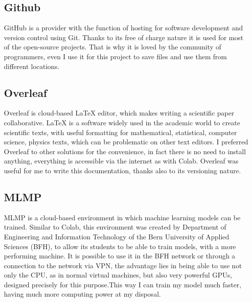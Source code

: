 \subsection{Github}
\gls{GitHub} \cite{github_inc_github_nodate} is a provider with the function of hosting for software development and version control using Git.
Thanks to its free of charge nature it is used for most of the open-source projects.
That is why it is loved by the community of programmers, even I use it for this project to save files and use them from different locations.


\subsection{Overleaf}
\gls{Overleaf} \cite{noauthor_overleaf_nodate} is cloud-based \LaTeX{} editor, which makes writing a scientific paper collaborative. \LaTeX{} is a software widely used in the academic world to create scientific texts, with useful formatting for mathematical, statistical, computer science, physics texts, which can be problematic on other text editors.
I preferred \gls{Overleaf} to other solutions for the convenience, in fact there is no need to install anything, everything is accessible via the internet as with Colab.
\gls{Overleaf} was useful for me to write this documentation, thanks also to its versioning nature.

\subsection{MLMP}
\gls{MLMP} \cite{berner_fachhochschule_mlmp_nodate} is a cloud-based environment in which machine learning models can be trained. Similar to Colab, this environment was created by Department of Engineering and Information Technology of the Bern University of Applied Sciences (BFH), to allow its students to be able to train models, with a more performing machine. It is possible to use it in the BFH network or through a connection to the network via VPN, the advantage lies in being able to use not only the CPU, as in normal virtual machines, but also very powerful GPUs, designed precisely for this purpose.This way I can train my model much faster, having much more computing power at my disposal.

